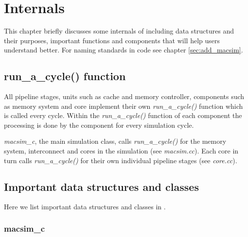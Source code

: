 \chapter{\SIM Internals}
\label{sec:codetop}

This chapter briefly discusses some internals of \SIM including data structures
and their purposes, important functions and components that will help users
understand \SIM better. For naming standards in \SIM code see chapter \ref{sec:add_macsim}.

\section{run\_a\_cycle() function}

All pipeline stages, units such as cache and memory controller, components such
as memory system and core implement their own \textit{run\_a\_cycle()} function which
is called every cycle. Within the \textit{run\_a\_cycle()} function of each
component the processing is done by the component for every simulation cycle.

\noindent \textit{macsim\_c}, the main simulation class, calls \textit{run\_a\_cycle()} for
the memory system, interconnect and cores in the simulation (see
\textit{macsim.cc}). Each core in turn calls \textit{run\_a\_cycle()} for
their own individual pipeline stages (see \textit{core.cc}).


\section{Important data structures and classes}

Here we list important data structures and classes in \SIM.

\subsection{macsim\_c}

